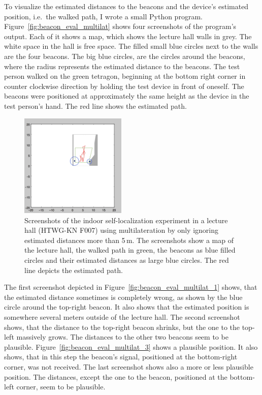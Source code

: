 To visualize the estimated distances to the beacons and the device's estimated position, i.e.\ the walked path, I wrote a small Python program. Figure~\ref{fig:beacon_eval_multilat} shows four screenshots of the program's output. Each of it shows a map, which shows the lecture hall walls in grey. The white space in the hall is free space. The filled small blue circles next to the walls are the four beacons. The big blue circles, are the circles around the beacons, where the radius represents the estimated distance to the beacons. The test person walked on the green tetragon, beginning at the bottom right corner in counter clockwise direction by holding the test device in front of oneself. The beacons were positioned at approximately the same height as the device in the test person's hand. The red line shows the estimated path.

\begin{figure}
	\includegraphics[width=0.45\textwidth]{figures/multilat_less5m}
	\caption{Screenshots of the indoor self-localization experiment in a lecture hall (HTWG-KN F007) using multilateration by only ignoring estimated distances more than 5\,m. The screenshots show a map of the lecture hall, the walked path in green, the beacons as blue filled circles and their estimated distances as large blue circles. The red line depicts the estimated path.}
	\label{fig:beacon_eval_multilat_less5m}
\end{figure}

The first screenshot depicted in Figure~\ref{fig:beacon_eval_multilat_1} shows, that the estimated distance sometimes is completely wrong, as shown by the blue circle around the top-right beacon. It also shows that the estimated position is somewhere several meters outside of the lecture hall. The second screenshot shows, that the distance to the top-right beacon shrinks, but the one to the top-left massively grows. The distances to the other two beacons seem to be plausible. Figure~\ref{fig:beacon_eval_multilat_3} shows a plausible position. It also shows, that in this step the beacon's signal, positioned at the bottom-right corner, was not received. The last screenshot shows also a more or less plausible position. The distances, except the one to the beacon, positioned at the bottom-left corner, seem to be plausible.

